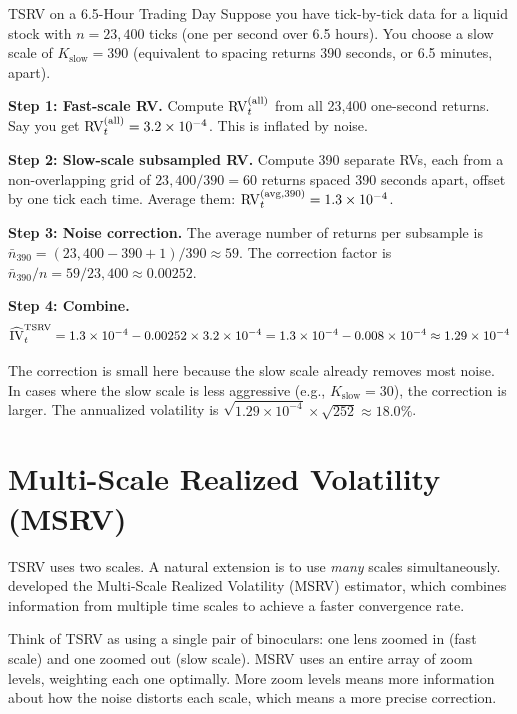 \begin{workedexample}{TSRV on a 6.5-Hour Trading Day}
Suppose you have tick-by-tick data for a liquid stock with $n = 23{,}400$ ticks (one per second over 6.5 hours).
You choose a slow scale of $K_{\text{slow}} = 390$ (equivalent to spacing returns 390 seconds, or 6.5 minutes, apart).

\textbf{Step 1: Fast-scale RV.}
Compute $\operatorname{RV}^{(\text{all})}_t$ from all 23,400 one-second returns.
Say you get $\operatorname{RV}^{(\text{all})}_t = 3.2 \times 10^{-4}$.
This is inflated by noise.

\textbf{Step 2: Slow-scale subsampled RV.}
Compute 390 separate RVs, each from a non-overlapping grid of $23{,}400 / 390 = 60$ returns spaced 390 seconds apart, offset by one tick each time.
Average them: $\operatorname{RV}^{(\text{avg}, 390)}_t = 1.3 \times 10^{-4}$.

\textbf{Step 3: Noise correction.}
The average number of returns per subsample is $\bar{n}_{390} = (23{,}400 - 390 + 1)/390 \approx 59$.
The correction factor is $\bar{n}_{390}/n = 59/23{,}400 \approx 0.00252$.

\textbf{Step 4: Combine.}
\[
  \widehat{\operatorname{IV}}_t^{\text{TSRV}} = 1.3 \times 10^{-4} - 0.00252 \times 3.2 \times 10^{-4} = 1.3 \times 10^{-4} - 0.008 \times 10^{-4} \approx 1.29 \times 10^{-4}
\]

The correction is small here because the slow scale already removes most noise.
In cases where the slow scale is less aggressive (e.g., $K_{\text{slow}} = 30$), the correction is larger.
The annualized volatility is $\sqrt{1.29 \times 10^{-4}} \times \sqrt{252} \approx 18.0\%$.
\end{workedexample}


\section{Multi-Scale Realized Volatility (MSRV)}
\label{sec:msrv}

TSRV uses two scales.
A natural extension is to use \emph{many} scales simultaneously.
\citet{Zhang2006} developed the Multi-Scale Realized Volatility (MSRV) estimator, which combines information from multiple time scales to achieve a faster convergence rate.

\begin{intuition}
Think of TSRV as using a single pair of binoculars: one lens zoomed in (fast scale) and one zoomed out (slow scale).
MSRV uses an entire array of zoom levels, weighting each one optimally.
More zoom levels means more information about how the noise distorts each scale, which means a more precise correction.
\end{intuition}

